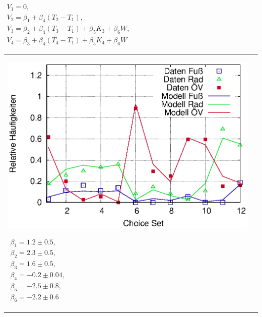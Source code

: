 \documentclass[a4paper]{foils}
\begin{document}
\begin{landscape}
\begin{center}


\vspace{0em}  

{\small
$
\begin{array}{l}
V_1=0,\\ 
V_2=\beta_1+\beta_4(T_2-T_1),\\
V_3=\beta_2+\beta_4(T_3-T_1)+\beta_5 K_3+\beta_6W, \\
V_4=\beta_3+\beta_4(T_4-T_1)+\beta_5 K_4+\beta_6W
\end{array}
$
}

\begin{tabular}{ll}
\parbox{1.00\textwidth}{
\includegraphics[width=1.0\textwidth]{statedChoiceWS1213_fProb.eps}
}
\parbox{0.30\textwidth}{
 {\small
 $
 \begin{array}{l}
 \beta_1=1.2\pm 0.5, \\
 \beta_2=2.3\pm0.5, \\
 \beta_3=1.6\pm 0.5, \\
 \beta_4=-0.2\pm 0.04, \\
 \beta_5=-2.5\pm 0.8, \\
 \beta_6=-2.2\pm 0.6
 \end{array}
 $
}}
\end{tabular}

\newpage
\\[2em]


\end{center}
\end{landscape}
\end{document}
